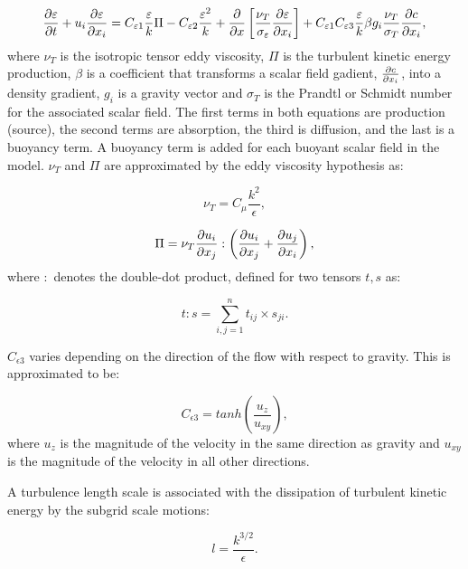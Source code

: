 \begin{equation}\label{eps}
\ppt[t]{\epsilon} + u_i \ppx[x_i]{\epsilon} = C_{\epsilon1} \frac {\epsilon}{k} \Pi - C_{\epsilon2} \frac{\epsilon^2}{k} + \ppx{} \left [ \frac{\nu_T}{\sigma_\epsilon} \ppx[x_i]{\epsilon} \right ] + C_{\epsilon1} C_{\epsilon3} \frac {\epsilon}{k} \beta g_i \frac{\nu_T}{\sigma_T} \ppx[x_i]{c},
\end{equation}
where $\nu_T$ is the isotropic tensor eddy viscosity, $\Pi$ is the turbulent kinetic energy production, $\beta$ is a coefficient that transforms a scalar field gadient, $\ppx[x_i]{c}$, into a density gradient, $g_i$ is a gravity vector and $\sigma_T$ is the Prandtl or Schmidt number for the associated scalar field. The first terms in both equations are production (source), the second terms are absorption, the third is diffusion, and the last is a buoyancy term. A buoyancy term is added for each buoyant scalar field in the model. $\nu_T$ and $\Pi$ are approximated by the eddy viscosity hypothesis as:

\begin{equation}\label{nut}
\nu_T = C_\mu \frac{k^2}{\epsilon},
\end{equation}

\begin{equation}\label{Pi2}
\Pi = \nu_T \ppx[x_j]{u_i} : \left ( \ppx[x_j]{u_i} + \ppx[x_i]{u_j} \right ),
\end{equation}
where $:$ denotes the double-dot product, defined for two tensors $t, s$ as:

\begin{equation}\label{doubledot}
t:s = \sum_{i,j=1}^{n} t_{ij} \times s_{ji}.
\end{equation}

$C_{\epsilon3}$ varies depending on the direction of the flow with respect to gravity. This is approximated to be:

\begin{equation}\label{Cepsilon3}
C_{\epsilon3} = tanh\left ( \frac{u_z}{u_{xy}}  \right ),
\end{equation}
where $u_z$ is the magnitude of the velocity in the same direction as gravity and $u_{xy}$ is the magnitude of the velocity in all other directions.

A turbulence length scale is associated with the dissipation of turbulent kinetic energy by the subgrid scale motions:

\begin{equation}\label{lengthscale}
l = \frac{k^{3/2}}{\epsilon}.
\end{equation}

